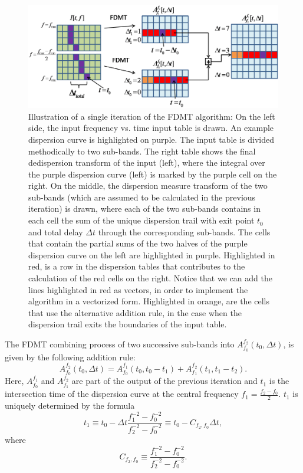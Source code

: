 \documentclass[iop]{emulateapj}
\begin{document}
\begin{figure}
\centering
\includegraphics[width = 180mm]{FDMT_ALG_DESCRIPTION.eps}
\caption{Illustration of a single iteration of the FDMT algorithm: On the left side, the input frequency vs. time input table is drawn. An example dispersion curve is highlighted on purple. The input table is divided methodically to two sub-bands.  The right table shows the final dedispersion transform of the input (left), where the integral over the purple dispersion curve (left) is marked by the purple cell on the right. On the middle, the dispersion measure transform of the two sub-bands (which are assumed to be calculated in the previous iteration) is drawn, where each of the two sub-bands contains in each cell the sum of the unique dispersion trail with exit point $t_0$ and total delay $\Delta t$ through the corresponding sub-bands. The cells that contain the partial sums of the two halves of the purple dispersion curve on the left are highlighted in purple. Highlighted in red, is a row in the dispersion tables that contributes to the calculation of the red cells on the right. Notice that we can add the lines highlighted in red as vectors, in order to implement the algorithm in a vectorized form. Highlighted in orange, are the cells that use the alternative addition rule, in the case when the dispersion trail exits the boundaries of the input table.  }\label{fig:AdditionRule}
\end{figure}

The FDMT combining process of two successive sub-bands into $A_{f_0}^{f_2}(t_0,\Delta t)$, is given by the following addition rule:
\begin{equation}
A_{f_0}^{f_2}(t_0,\Delta t) = A_{f_0}^{f_1}(t_0,t_0 - t_1) + A_{f_1}^{f_2}(t_1 ,t_1-t_2).
\end{equation}
Here, $A_{f_0}^{f_1}$ and $A_{f_1}^{f_2}$ are part of the output of the previous iteration and $t_1$ is the intersection time  of the dispersion curve at the central frequency $f_1 = \frac{f_2-f_0}{2}$.
$t_1$ is uniquely determined by the formula
\begin{equation}
t_1 \equiv t_0 - \Delta t\frac{f_1^{-2} - f_0^{-2}}{f_2^{-2} - f_0^{-2}} \equiv t_0 - C_{f_2,f_0}\Delta t,
\end{equation}
where 
\begin{equation} \label{Eq:Cf2f0}
C_{f_2,f_0} \equiv \frac{f_1^{-2} - f_0^{-2}}{f_2^{-2} - f_0^{-2}}.
\end{equation} 
\end{document}
